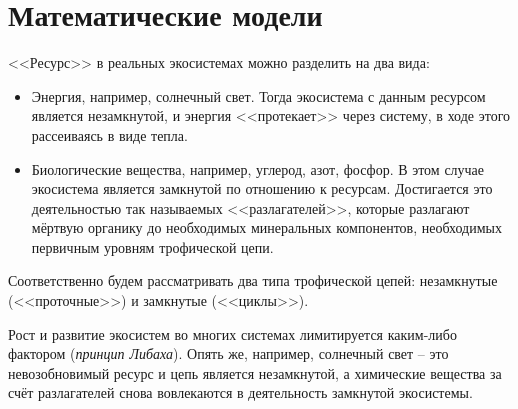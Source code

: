 \section{Математические модели}
    <<Ресурс>> в реальных экосистемах можно разделить на два вида:
    \begin{itemize}
        \item Энергия, например, солнечный свет. Тогда экосистема с данным ресурсом является незамкнутой, и энергия <<протекает>> через систему, в ходе этого рассеиваясь в виде тепла.
        \item Биологические вещества, например, углерод, азот, фосфор. В этом случае экосистема является замкнутой по отношению к ресурсам. Достигается это деятельностью так называемых <<разлагателей>>, которые разлагают мёртвую органику до необходимых минеральных компонентов, необходимых первичным уровням трофической цепи.
    \end{itemize}

    Соответственно будем рассматривать два типа трофической цепей: незамкнутые (<<проточные>>) и замкнутые (<<циклы>>).

    Рост и развитие экосистем во многих системах лимитируется каким-либо фактором (\textit{принцип Либаха}). Опять же, например, солнечный свет -- это невозобновимый ресурс и цепь является незамкнутой, а химические вещества за счёт разлагателей снова вовлекаются в деятельность замкнутой экосистемы.
    

